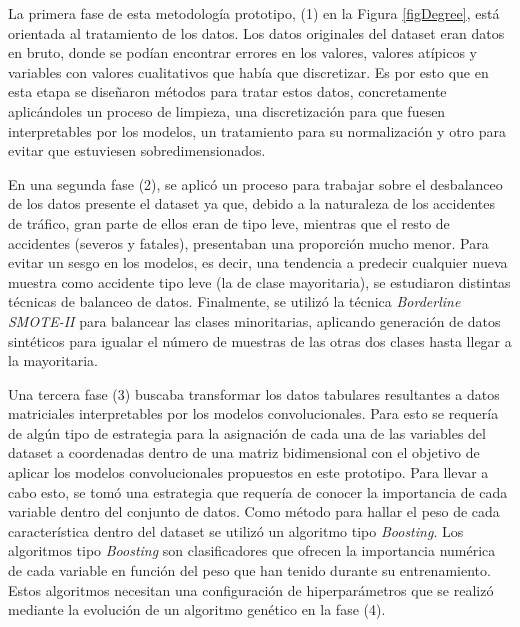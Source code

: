 La primera fase de esta metodología prototipo, (1) en la Figura \ref{figDegree}, está orientada al tratamiento de los datos. Los datos originales del dataset eran datos en bruto, donde se podían encontrar errores en los valores, valores atípicos y variables con valores cualitativos que había que discretizar. Es por esto que en esta etapa se diseñaron métodos para tratar estos datos, concretamente aplicándoles un proceso de limpieza, una discretización para que fuesen interpretables por los modelos, un tratamiento para su normalización y otro para evitar que estuviesen sobredimensionados.

En una segunda fase (2), se aplicó un proceso para trabajar sobre el desbalanceo de los datos presente el dataset ya que, debido a la naturaleza de los accidentes de tráfico, gran parte de ellos eran de tipo leve, mientras que el resto de accidentes (severos y fatales), presentaban una proporción mucho menor. Para evitar un sesgo en los modelos, es decir, una tendencia a predecir cualquier nueva muestra como accidente tipo leve (la de clase mayoritaria), se estudiaron distintas técnicas de balanceo de datos. Finalmente, se utilizó la técnica \textit{Borderline SMOTE-II} para balancear las clases minoritarias, aplicando generación de datos sintéticos para igualar el número de muestras de las otras dos clases hasta llegar a la mayoritaria.

Una tercera fase (3) buscaba transformar los datos tabulares resultantes a datos matriciales interpretables por los modelos convolucionales. Para esto se requería de algún tipo de estrategia para la asignación de cada una de las variables del dataset a coordenadas dentro de una matriz bidimensional con el objetivo de aplicar los modelos convolucionales propuestos en este prototipo. Para llevar a cabo esto, se tomó una estrategia que requería de conocer la importancia de cada variable dentro del conjunto de datos. Como método para hallar el peso de cada característica dentro del dataset se utilizó un algoritmo tipo \textit{Boosting}. Los algoritmos tipo \textit{Boosting} son clasificadores que ofrecen la importancia numérica de cada variable en función del peso que han tenido durante su entrenamiento. Estos algoritmos necesitan una configuración de hiperparámetros que se realizó mediante la evolución de un algoritmo genético en la fase (4).

